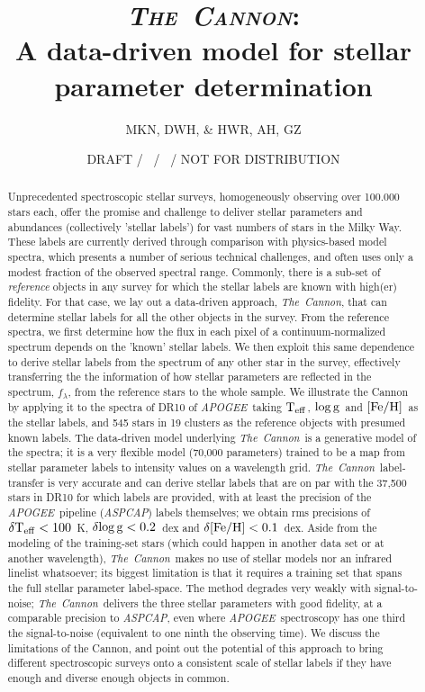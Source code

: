 \documentclass[12pt, preprint]{aastex}
\newcommand{\teff}{\mbox{$\rm T_{eff}$}}
\newcommand{\feh}{\mbox{$\rm [Fe/H]$}}
\newcommand{\logg}{\mbox{$\rm \log g$}}
\newcommand{\tc}{\textsl{The~Cannon}}
\newcommand{\apogee}{\textsl{APOGEE}}
\newcommand{\aspcap}{\textsl{ASPCAP}}
\begin{document}
\title{\textsc{\tc:}\\ A data-driven model for stellar parameter determination}
\author{
  MKN,
  DWH,
  \&
  HWR,
  AH, GZ} 
\date{DRAFT / \gitdate\ / \githash\ / NOT FOR DISTRIBUTION}



\begin{abstract}%

Unprecedented spectroscopic stellar surveys, homogeneously
observing over 100.000 stars each, offer the
promise and challenge to deliver stellar parameters and
abundances (collectively 'stellar labels') for vast numbers of
stars in the Milky Way. These labels are currently derived
through comparison with physics-based model spectra,
which presents a number of serious technical
challenges, and often uses only a modest fraction of the
observed spectral range.  Commonly, there is a sub-set of
{\it reference} objects in any survey for which the stellar labels
are known with high(er) fidelity. For that case,
we lay out a data-driven approach, \tc,
that can determine stellar labels for all the other objects
in the survey. From the reference spectra, we first determine how
the flux in each pixel of a continuum-normalized spectrum
depends on the 'known' stellar labels. We then exploit this
same dependence to derive stellar labels from the spectrum
of any other star in the survey, effectively transferring the
the information of how stellar parameters are reflected in
the spectrum, $f_\lambda$, from the reference stars to the whole sample. We illustrate the Cannon by applying it to the spectra of DR10 of \apogee\ taking \teff, \logg\ and \feh\ as the stellar labels, and 545 stars in 19 clusters
as the reference objects with presumed known labels.
The data-driven model underlying \tc\ is a generative model of the
spectra; it is a very flexible model (70,000 parameters) trained to be
a map from stellar parameter labels to intensity values on a wavelength
grid. \tc\ label-transfer is very accurate and can derive stellar labels that are on par with the 
37,500 stars in DR10 for which labels are provided, with at least the precision of the \apogee\ pipeline (\aspcap) 
labels themselves; we obtain rms precisions of $\delta\teff< 100$~K,
$\delta\logg< 0.2$~dex and $\delta\feh< 0.1$~dex. Aside from the modeling of the training-set stars (which could happen
in another data set or at another wavelength), \tc\ makes no use of
stellar models nor an infrared linelist whatsoever; its biggest limitation is that it requires a
training set that spans the full stellar parameter label-space.
The method degrades very weakly with signal-to-noise; \tc\ delivers
the three stellar parameters with good fidelity, at a comparable precision to \aspcap, even where
\apogee\ spectroscopy has one third the
signal-to-noise (equivalent to one ninth the observing time). We discuss the limitations of the Cannon, and point
out the potential of this approach to bring different spectroscopic
surveys onto a consistent scale of stellar labels if they have
enough and diverse enough objects in common. 


\end{abstract}
\end{document}
